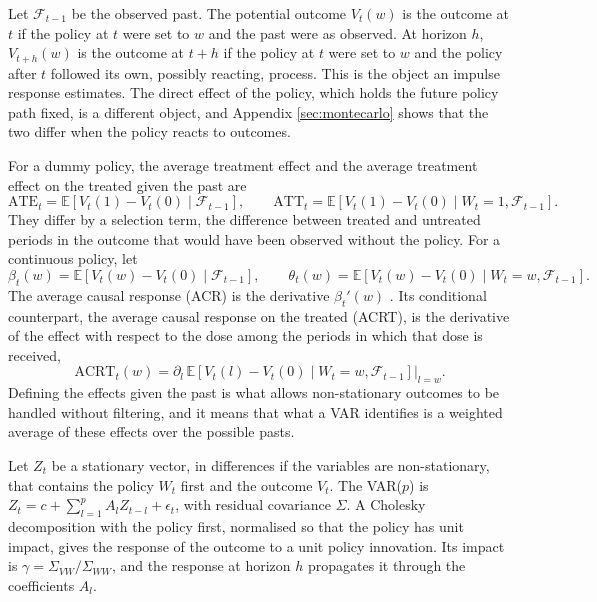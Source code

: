 \documentclass[12pt,a4paper]{article}
\theoremstyle{definition}
\newcommand{\E}{\mathbb{E}}
\begin{document}
Let $\mathcal{F}_{t-1}$ be the observed past. The potential outcome $V_t(w)$ is the outcome at $t$ if the policy at $t$ were set to $w$ and the past were as observed. At horizon $h$, $V_{t+h}(w)$ is the outcome at $t+h$ if the policy at $t$ were set to $w$ and the policy after $t$ followed its own, possibly reacting, process. This is the object an impulse response estimates. The direct effect of the policy, which holds the future policy path fixed, is a different object, and Appendix \ref{sec:montecarlo} shows that the two differ when the policy reacts to outcomes.

For a dummy policy, the average treatment effect and the average treatment effect on the treated given the past are
\begin{equation}
\mathrm{ATE}_t=\E[V_t(1)-V_t(0)\mid\mathcal{F}_{t-1}],\qquad \mathrm{ATT}_t=\E[V_t(1)-V_t(0)\mid W_t=1,\mathcal{F}_{t-1}].
\label{eq:ate-att}
\end{equation}
They differ by a selection term, the difference between treated and untreated periods in the outcome that would have been observed without the policy. For a continuous policy, let
\begin{equation}
\beta_t(w)=\E[V_t(w)-V_t(0)\mid\mathcal{F}_{t-1}],\qquad \theta_t(w)=\E[V_t(w)-V_t(0)\mid W_t=w,\mathcal{F}_{t-1}].
\label{eq:beta-theta}
\end{equation}
The average causal response (ACR) is the derivative $\beta_t'(w)$ \citep{AngristImbensACR1995}. Its conditional counterpart, the average causal response on the treated (ACRT), is the derivative of the effect with respect to the dose among the periods in which that dose is received,
\begin{equation}
\mathrm{ACRT}_t(w)=\partial_l\,\E[V_t(l)-V_t(0)\mid W_t=w,\mathcal{F}_{t-1}]\big|_{l=w}.
\label{eq:acrt}
\end{equation}
Defining the effects given the past is what allows non-stationary outcomes to be handled without filtering, and it means that what a VAR identifies is a weighted average of these effects over the possible pasts.



Let $Z_t$ be a stationary vector, in differences if the variables are non-stationary, that contains the policy $W_t$ first and the outcome $V_t$. The VAR($p$) is $Z_t=c+\sum_{l=1}^pA_lZ_{t-l}+\epsilon_t$, with residual covariance $\Sigma$. A Cholesky decomposition with the policy first, normalised so that the policy has unit impact, gives the response of the outcome to a unit policy innovation. Its impact is $\gamma=\Sigma_{VW}/\Sigma_{WW}$, and the response at horizon $h$ propagates it through the coefficients $A_l$.
\end{document}
